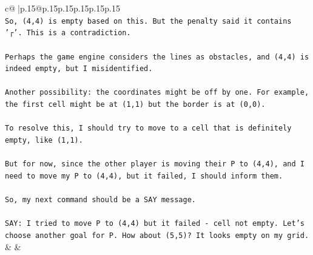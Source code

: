 \documentclass{article}
\begin{document}
{\begin{supertabular}{c@{$\;$}|p{.15\linewidth}@{}p{.15\linewidth}p{.15\linewidth}p{.15\linewidth}p{.15\linewidth}p{.15\linewidth}}
{{{\\ 
\texttt{So, (4,4) is empty based on this. But the penalty said it contains '┌'. This is a contradiction.} \\
\\ 
\texttt{Perhaps the game engine considers the lines as obstacles, and (4,4) is indeed empty, but I misidentified.} \\
\\ 
\texttt{Another possibility: the coordinates might be off by one. For example, the first cell might be at (1,1) but the border is at (0,0).} \\
\\ 
\texttt{To resolve this, I should try to move to a cell that is definitely empty, like (1,1).} \\
\\ 
\texttt{But for now, since the other player is moving their P to (4,4), and I need to move my P to (4,4), but it failed, I should inform them.} \\
\\ 
\texttt{So, my next command should be a SAY message.} \\
\\ 
\texttt{SAY: I tried to move P to (4,4) but it failed {-} cell not empty. Let's choose another goal for P. How about (5,5)? It looks empty on my grid.} \\
            }
        }
    }
    & & \\ \\


\end{supertabular}}
\end{document}
